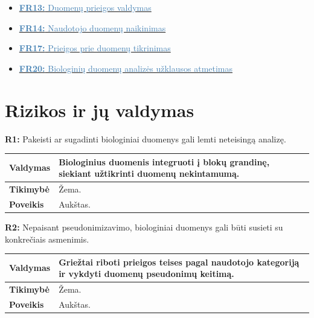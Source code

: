 \documentclass[12pt]{article}
\begin{document}
\begin{itemize}[leftmargin=0.3cm, itemsep=-7pt, topsep=1pt, after=\vspace{-1em}]
    \item \hyperlink{FR13}{\textcolor{steelblue}{\textbf{FR13:}
    Duomenų prieigos valdymas}}
    \item \hyperlink{FR14}{\textcolor{steelblue}{\textbf{FR14:}
    Naudotojo duomenų naikinimas}}
    \item \hyperlink{FR17}{\textcolor{steelblue}{\textbf{FR17:}
    Prieigos prie duomenų tikrinimas}}
    \item \hyperlink{FR20}{\textcolor{steelblue}{\textbf{FR20:}
    Biologinių duomenų analizės užklausos atmetimas}}
\end{itemize}  

\newpage

\section{Rizikos ir jų valdymas}
\noindent \textbf{R1:} Pakeisti ar sugadinti biologiniai duomenys gali lemti
neteisingą analizę.

\label{sec:R1}
\begin{table}[htb!]
    \captionsetup{justification=centering}
    \vskip -10pt
    \begin{tabular}{|m{3cm}|m{13.7cm}|}
        \hline
        \raggedleft \textbf{\cellcolor{deepchampagne}Valdymas} &
        Biologinius duomenis integruoti į blokų grandinę, siekiant užtikrinti
        duomenų nekintamumą. \\
        \hline
        \raggedleft \textbf{\cellcolor{deepchampagne}Tikimybė} & Žema. \\
        \hline
        \raggedleft \textbf{\cellcolor{deepchampagne}Poveikis} & Aukštas. \\
        \hline
    \end{tabular}
\end{table}

\noindent \textbf{R2:} Nepaisant pseudonimizavimo, biologiniai duomenys gali
būti susieti su konkrečiais asmenimis.

\label{sec:R2}
\begin{table}[htb!]
    \captionsetup{justification=centering}
    \vskip -10pt
    \begin{tabular}{|m{3cm}|m{13.7cm}|}
        \hline
        \raggedleft \textbf{\cellcolor{deepchampagne}Valdymas} &
        Griežtai riboti prieigos teises pagal naudotojo kategoriją ir vykdyti
        duomenų pseudonimų keitimą. \\
        \hline
        \raggedleft \textbf{\cellcolor{deepchampagne}Tikimybė} & Žema. \\
        \hline
        \raggedleft \textbf{\cellcolor{deepchampagne}Poveikis} & Aukštas. \\
        \hline
    \end{tabular}
\end{table}
\end{document}
